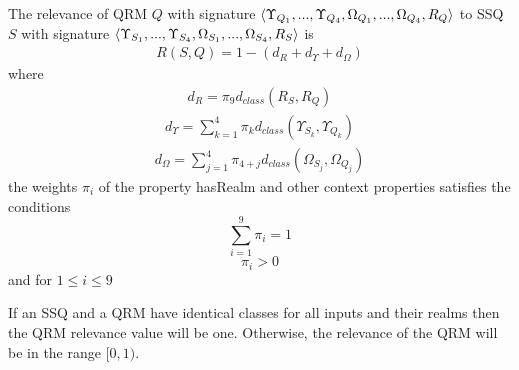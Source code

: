 The relevance of QRM $Q$ with signature $\langle \Upsilon_{Q_1}, ...,
\Upsilon_{Q_4}, \\\Omega_{Q_1}, ... , \Omega_{Q_4}, R_Q\rangle$ to SSQ
$S$ with signature $\langle \Upsilon_{S_1}, ..., \Upsilon_{S_4},
\\\Omega_{S_1}, ... , \Omega_{S_4}, R_S \rangle$ is
\begin{eqnarray}
\label{qrmsimilarity}
 R(S,Q) = 1 - (d_{R} + d_{\Upsilon} + d_{\Omega})
\end{eqnarray}
\noindent where 
\begin{eqnarray}
d_{R} = \pi_9 d_{class}(R_S,R_Q) 
\end{eqnarray}
\begin{eqnarray}
d_{\Upsilon}  = \sum_{k=1}^4 {\pi_k} {d_{class}(\Upsilon_{S_k},\Upsilon_{Q_k})} 
\end{eqnarray}
\begin{eqnarray}
 d_{\Omega} = \sum_{j=1}^4 \pi_{4+j} d_{class}(\Omega_{S_j},\Omega_{Q_j}) 
\end{eqnarray}
\noindent the weights ${\pi}_i$ of the property hasRealm and other context properties satisfies the conditions
\begin{equation}
\label{piconstraint1}
\sum_{i=1}^{9} {{\pi}_i} = 1
\end{equation}
\begin{equation}
\label{piconstraint2}
{\pi}_i > 0
\end{equation}
\noindent and for $1 \leq i \leq 9$

If an SSQ and a QRM have identical classes for all inputs and their
realms then the QRM relevance value will be one. Otherwise, the
relevance of the QRM will be in the range $[0, 1)$. 

